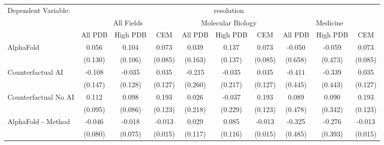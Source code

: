 \begingroup
\centering
\begin{tabular}{lccccccccc}
   \tabularnewline \midrule \midrule
   Dependent Variable: & \multicolumn{9}{c}{resolution}\\
 & \multicolumn{3}{c}{All Fields} & \multicolumn{3}{c}{Molecular Biology} & \multicolumn{3}{c}{Medicine} \\
\cmidrule(lr){2-7} \cmidrule(lr){5-10} \cmidrule(lr){8-7}
 & \multicolumn{1}{c}{All PDB} & \multicolumn{1}{c}{High PDB} & \multicolumn{1}{c}{CEM} & \multicolumn{1}{c}{All PDB} & \multicolumn{1}{c}{High PDB} & \multicolumn{1}{c}{CEM} & \multicolumn{1}{c}{All PDB} & \multicolumn{1}{c}{High PDB} & \multicolumn{1}{c}{CEM} \\
\cmidrule(lr){2-3} \cmidrule(lr){3-4} \cmidrule(lr){4-5} \cmidrule(lr){5-6} \cmidrule(lr){6-7} \cmidrule(lr){7-8} \cmidrule(lr){8-9} \cmidrule(lr){9-10} \cmidrule(lr){10-3}
   AlphaFold                                                   & 0.056        & 0.104         & 0.073         & 0.039       & 0.137        & 0.073         & -0.050    & -0.059  & 0.073\\   
                                                               & (0.130)      & (0.106)       & (0.085)       & (0.163)     & (0.137)      & (0.085)       & (0.658)   & (0.473) & (0.085)\\   
   Counterfactual AI                                           & -0.108       & -0.035        & 0.035         & -0.215      & -0.035       & 0.035         & -0.411    & -0.339  & 0.035\\   
                                                               & (0.147)      & (0.128)       & (0.127)       & (0.260)     & (0.217)      & (0.127)       & (0.445)   & (0.443) & (0.127)\\   
   Counterfactual No AI                                        & 0.112        & 0.098         & 0.193         & 0.026       & -0.037       & 0.193         & 0.089     & 0.090   & 0.193\\   
                                                               & (0.095)      & (0.086)       & (0.123)       & (0.218)     & (0.229)      & (0.123)       & (0.478)   & (0.342) & (0.123)\\   
   AlphaFold - Method                                          & -0.046       & -0.018        & -0.013        & 0.029       & 0.085        & -0.013        & -0.325    & -0.276  & -0.013\\   
                                                               & (0.080)      & (0.075)       & (0.015)       & (0.117)     & (0.116)      & (0.015)       & (0.485)   & (0.393) & (0.015)\\   

\end{tabular}
